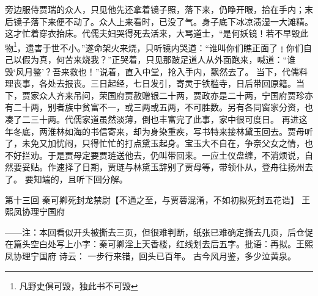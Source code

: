 \documentclass[12pt,oneside]{book}
\begin{document}
旁边服侍贾瑞的众人，只见他先还拿着镜子照，落下来，仍睁开眼，拾在手内；末后镜子落下来便不动了。众人上来看时，已没了气。身子底下冰凉渍湿一大滩精。这才忙着穿衣抬床。代儒夫妇哭得死去活来，大骂道士，“是何妖镜！若不早毁此物\footnote{凡野史俱可毁，独此书不可毁}，遗害于世不小。”遂命架火来烧，只听镜内哭道：“谁叫你们瞧正面了﹗你们自己以假为真，何苦来烧我？”正哭着，只见那跛足道人从外面跑来，喊道：“谁毁‘风月鉴’？吾来救也！”说着，直入中堂，抢入手内，飘然去了。
当下，代儒料理丧事，各处去报丧。三日起经，七日发引，寄灵于铁槛寺，日后带回原籍。当下，贾家众人齐来吊问，荣国府贾赦赠银二十两，贾政亦是二十两，宁国府贾珍亦有二十两，别者族中贫富不一，或三两或五两，不可胜数。另有各同窗家分资，也凑了二三十两。代儒家道虽然淡薄，倒也丰富完了此事，家中很可度日。
再进这年冬底，两淮林如海的书信寄来，却为身染重疾，写书特来接林黛玉回去。贾母听了，未免又加忧闷，只得忙忙的打点黛玉起身。宝玉大不自在，争奈父女之情，也不好拦劝。于是贾母定要贾琏送他去，仍叫带回来。一应土仪盘缠，不消烦说，自然要妥贴。作速择了日期，贾琏与林黛玉辞别了贾母等，带领仆从，登舟往扬州去了。
要知端的，且听下回分解。





 
第十三回  秦可卿死封龙禁尉【不通之至，与贾蓉混淆，不如初拟死封五花诰】
王熙凤协理宁国府


——注：本回看似开头被撕去三页，但很难判断，纸张已难确定撕去几页，后仓促在篇头空白处写上小字：秦可卿淫上天香楼，红线划去后五字。批语：再拟。王熙凤协理宁国府
诗云：
一步行来错，回头已百年。
古今风月鉴，多少泣黄泉。
\end{document}
